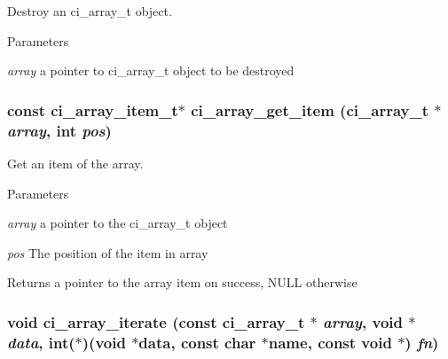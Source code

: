 Destroy an ci\_\-array\_\-t object. 
\begin{DoxyParams}{Parameters}
\item[{\em array}]a pointer to ci\_\-array\_\-t object to be destroyed \end{DoxyParams}
\hypertarget{group__SIMPLE__ARRAYS_gabdd79d08b37d9bfd1577ce52ece12a5c}{
\subsubsection[{ci\_\-array\_\-get\_\-item}]{\setlength{\rightskip}{0pt plus 5cm}const ci\_\-array\_\-item\_\-t$\ast$ ci\_\-array\_\-get\_\-item ({\bf ci\_\-array\_\-t} $\ast$ {\em array}, \/  int {\em pos})}}
\label{group__SIMPLE__ARRAYS_gabdd79d08b37d9bfd1577ce52ece12a5c}


Get an item of the array. 
\begin{DoxyParams}{Parameters}
\item[{\em array}]a pointer to the ci\_\-array\_\-t object \item[{\em pos}]The position of the item in array \end{DoxyParams}
\begin{DoxyReturn}{Returns}
a pointer to the array item on success, NULL otherwise 
\end{DoxyReturn}
\hypertarget{group__SIMPLE__ARRAYS_gacb8aadb5dacd5a6e9c9de728601d5977}{
\subsubsection[{ci\_\-array\_\-iterate}]{\setlength{\rightskip}{0pt plus 5cm}void ci\_\-array\_\-iterate (const {\bf ci\_\-array\_\-t} $\ast$ {\em array}, \/  void $\ast$ {\em data}, \/  int($\ast$)(void $\ast$data, const char $\ast$name, const void $\ast$) {\em fn})}}
\label{group__SIMPLE__ARRAYS_gacb8aadb5dacd5a6e9c9de728601d5977}


